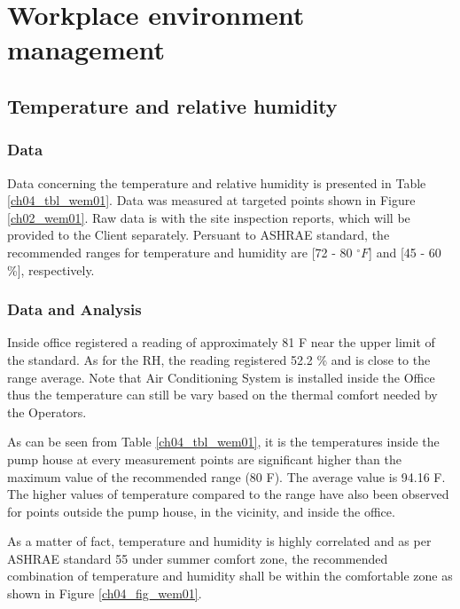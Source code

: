 \section{Workplace environment management}
\label{47}

\subsection{Temperature and relative humidity}
\subsubsection{Data}
Data concerning the temperature and relative humidity is presented in Table \ref{ch04_tbl_wem01}. Data was measured at targeted points shown in Figure \ref{ch02_wem01}. Raw data is with the site inspection reports, which will be provided to the Client separately. Persuant to ASHRAE standard, the recommended ranges for temperature and humidity are [72 - 80 $^\circ F$] and [45 - 60 \%], respectively.

\subsubsection{Data and Analysis}



Inside office registered a reading of approximately 81 F near the upper limit of the standard. As for the RH, the reading registered 52.2 \% and is close to the range average. Note that Air Conditioning System is installed inside the Office thus the temperature can still be vary based on the thermal comfort needed by the Operators.

As can be seen from Table \ref{ch04_tbl_wem01}, it is the temperatures inside the pump house at every measurement points are significant higher than the maximum value of the recommended range (80 F). The average value is 94.16 F. The higher values of temperature compared to the range have also been observed for points outside the pump house, in the vicinity, and inside the office. 

As a matter of fact, temperature and humidity is highly correlated and as per ASHRAE standard 55 under summer comfort zone, the recommended combination of temperature and humidity shall be within the comfortable zone as shown in Figure \ref{ch04_fig_wem01}.

